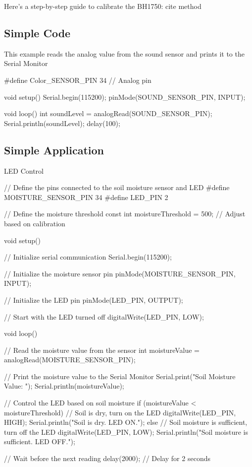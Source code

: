 Here’s a step-by-step guide to calibrate the BH1750:
cite method

\subsection{Simple Code}
This example reads the analog value from the sound sensor and prints it to the Serial Monitor

\begin{Arduino}
	#define Color_SENSOR_PIN 34  // Analog pin
	
	void setup() {
		Serial.begin(115200);
		pinMode(SOUND_SENSOR_PIN, INPUT);
	}
	
	void loop() {
		int soundLevel = analogRead(SOUND_SENSOR_PIN);
		Serial.println(soundLevel);
		delay(100);
	}
	
	
\end{Arduino}

\subsection{Simple Application}
LED Control

\begin{Arduino}
	// Define the pins connected to the soil moisture sensor and LED
	#define MOISTURE_SENSOR_PIN 34
	#define LED_PIN 2
	
	// Define the moisture threshold
	const int moistureThreshold = 500; // Adjust based on calibration
	
	void setup() {
		// Initialize serial communication
		Serial.begin(115200);
		
		// Initialize the moisture sensor pin
		pinMode(MOISTURE_SENSOR_PIN, INPUT);
		
		// Initialize the LED pin
		pinMode(LED_PIN, OUTPUT);
		
		// Start with the LED turned off
		digitalWrite(LED_PIN, LOW);
	}
	
	void loop() {
		// Read the moisture value from the sensor
		int moistureValue = analogRead(MOISTURE_SENSOR_PIN);
		
		// Print the moisture value to the Serial Monitor
		Serial.print("Soil Moisture Value: ");
		Serial.println(moistureValue);
		
		// Control the LED based on soil moisture
		if (moistureValue < moistureThreshold) {
			// Soil is dry, turn on the LED
			digitalWrite(LED_PIN, HIGH);
			Serial.println("Soil is dry. LED ON.");
		} else {
			// Soil moisture is sufficient, turn off the LED
			digitalWrite(LED_PIN, LOW);
			Serial.println("Soil moisture is sufficient. LED OFF.");
		}
		
		// Wait before the next reading
		delay(2000); // Delay for 2 seconds
	}
	
	
	
\end{Arduino}





